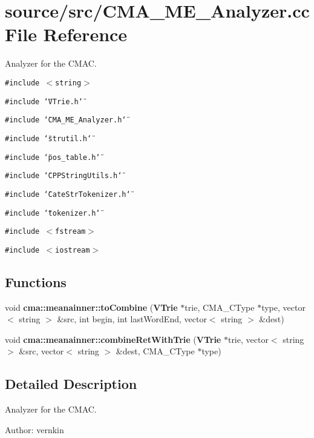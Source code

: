 \section{source/src/CMA\_\-ME\_\-Analyzer.cc File Reference}
\label{CMA__ME__Analyzer_8cc}
Analyzer for the CMAC.  


{\tt \#include $<$string$>$}\par
{\tt \#include \char`\"{}VTrie.h\char`\"{}}\par
{\tt \#include \char`\"{}CMA\_\-ME\_\-Analyzer.h\char`\"{}}\par
{\tt \#include \char`\"{}strutil.h\char`\"{}}\par
{\tt \#include \char`\"{}pos\_\-table.h\char`\"{}}\par
{\tt \#include \char`\"{}CPPStringUtils.h\char`\"{}}\par
{\tt \#include \char`\"{}CateStrTokenizer.h\char`\"{}}\par
{\tt \#include \char`\"{}tokenizer.h\char`\"{}}\par
{\tt \#include $<$fstream$>$}\par
{\tt \#include $<$iostream$>$}\par
\subsection*{Functions}
\begin{CompactItemize}
\item 
void {\bf cma::meanainner::toCombine} ({\bf VTrie} $\ast$trie, CMA\_\-CType $\ast$type, vector$<$ string $>$ \&src, int begin, int lastWordEnd, vector$<$ string $>$ \&dest)
\item 
void \textbf{cma::meanainner::combineRetWithTrie} ({\bf VTrie} $\ast$trie, vector$<$ string $>$ \&src, vector$<$ string $>$ \&dest, CMA\_\-CType $\ast$type)\label{namespacecma_1_1meanainner_aba0478eb017501ee85814fcbc0486fa}

\end{CompactItemize}


\subsection{Detailed Description}
Analyzer for the CMAC. 

\begin{Desc}
\item[Author:]vernkin \end{Desc}
